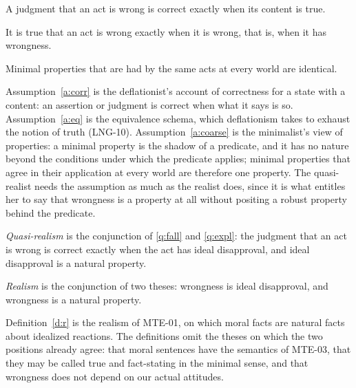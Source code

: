 \documentclass{situationist-preprint}
\begin{document}
\begin{assumption}\label{a:corr}
A judgment that an act is wrong is correct exactly when its content is true.
\end{assumption}

\begin{assumption}\label{a:eq}
It is true that an act is wrong exactly when it is wrong, that is, when it has wrongness.
\end{assumption}

\begin{assumption}\label{a:coarse}
Minimal properties that are had by the same acts at every world are identical.
\end{assumption}

Assumption~\ref{a:corr} is the deflationist's account of correctness for a state with a content: an assertion or judgment is correct when what it says is so. Assumption~\ref{a:eq} is the equivalence schema, which deflationism takes to exhaust the notion of truth (LNG-10). Assumption~\ref{a:coarse} is the minimalist's view of properties: a minimal property is the shadow of a predicate, and it has no nature beyond the conditions under which the predicate applies; minimal properties that agree in their application at every world are therefore one property. The quasi-realist needs the assumption as much as the realist does, since it is what entitles her to say that wrongness is a property at all without positing a robust property behind the predicate.

\begin{definition}\label{d:qr}
\emph{Quasi-realism} is the conjunction of \ref{q:fall} and \ref{q:expl}: the judgment that an act is wrong is correct exactly when the act has ideal disapproval, and ideal disapproval is a natural property.
\end{definition}

\begin{definition}[Realism]\label{d:r}
\emph{Realism} is the conjunction of two theses: wrongness is ideal disapproval, and wrongness is a natural property.
\end{definition}

Definition~\ref{d:r} is the realism of MTE-01, on which moral facts are natural facts about idealized reactions. The definitions omit the theses on which the two positions already agree: that moral sentences have the semantics of MTE-03, that they may be called true and fact-stating in the minimal sense, and that wrongness does not depend on our actual attitudes.
\end{document}
